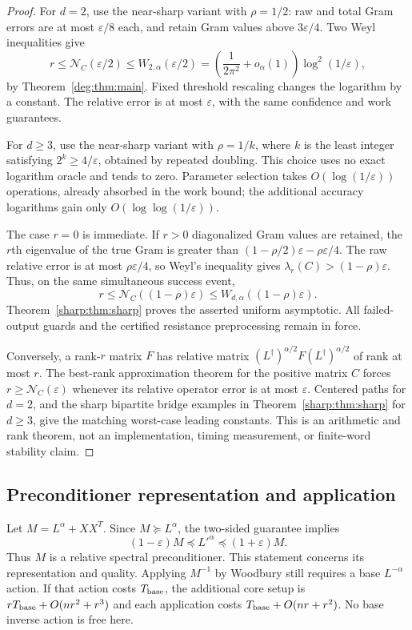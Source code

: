\begin{proof}
For $d=2$, use the near-sharp variant with $\rho=1/2$: raw and total
Gram errors are at most $\varepsilon/8$ each, and retain Gram values
above $3\varepsilon/4$. Two Weyl inequalities give
\[
 r\le\mathcal N_C(\varepsilon/2)
 \le W_{2,\alpha}(\varepsilon/2)
 =\left(\frac1{2\pi^2}+o_\alpha(1)\right)\log^2(1/\varepsilon),
\]
by Theorem~\ref{deg:thm:main}. Fixed threshold rescaling changes the
logarithm by a constant. The relative error is at most $\varepsilon$,
with the same confidence and work guarantees.

For $d\ge3$, use the near-sharp variant with $\rho=1/k$, where $k$ is the least
integer satisfying $2^k\ge4/\varepsilon$, obtained by repeated doubling.
This choice uses no exact logarithm oracle and tends to zero. Parameter
selection takes $O(\log(1/\varepsilon))$ operations, already absorbed
in the work bound; the additional accuracy logarithms gain only
$O(\log\log(1/\varepsilon))$.

The case $r=0$ is immediate. If $r>0$ diagonalized Gram values are
retained, the $r$th eigenvalue of
the true Gram is greater than $(1-\rho/2)\varepsilon-\rho\varepsilon/4$.
The raw relative error is at most $\rho\varepsilon/4$, so Weyl's inequality
gives $\lambda_r(C)>(1-\rho)\varepsilon$. Thus, on the same simultaneous
success event,
\[
 r\le\mathcal N_C((1-\rho)\varepsilon)
   \le W_{d,\alpha}((1-\rho)\varepsilon).
\]
Theorem~\ref{sharp:thm:sharp} proves the asserted uniform asymptotic.
All failed-output guards and the certified resistance preprocessing
remain in force.

Conversely, a rank-$r$ matrix $F$ has relative matrix
$(L^\dagger)^{\alpha/2}F(L^\dagger)^{\alpha/2}$ of rank at most $r$.
The best-rank approximation theorem for the positive matrix $C$ forces
$r\ge\mathcal N_C(\varepsilon)$ whenever its relative operator error
is at most $\varepsilon$. Centered paths for $d=2$, and the sharp
bipartite bridge examples in Theorem~\ref{sharp:thm:sharp} for $d\ge3$,
give the matching worst-case leading constants. This is an arithmetic and rank theorem, not an implementation,
timing measurement, or finite-word stability claim.
\end{proof}

\subsection{Preconditioner representation and application}
Let $M=L^\alpha+XX^T$. Since $M\succeq L^\alpha$, the two-sided
guarantee implies
\[
 (1-\varepsilon)M\preceq L'^\alpha\preceq(1+\varepsilon)M.
\]
Thus $M$ is a relative spectral preconditioner. This statement concerns
its representation and quality. Applying $M^{-1}$ by Woodbury still
requires a base $L^{-\alpha}$ action. If that action costs $T_{\rm base}$,
the additional core setup is
$rT_{\rm base}+O(nr^2+r^3)$ and each application costs
$T_{\rm base}+O(nr+r^2)$. No base inverse action is free here.

